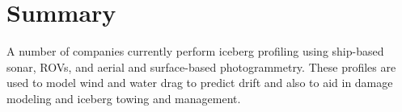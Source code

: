 %
%
%
%
%

\section{Summary}

A number of companies currently perform iceberg profiling using ship-based sonar, ROVs, and aerial and surface-based photogrammetry. These profiles are used to model wind and water drag to predict drift and also to aid in damage modeling and iceberg towing and management. 


